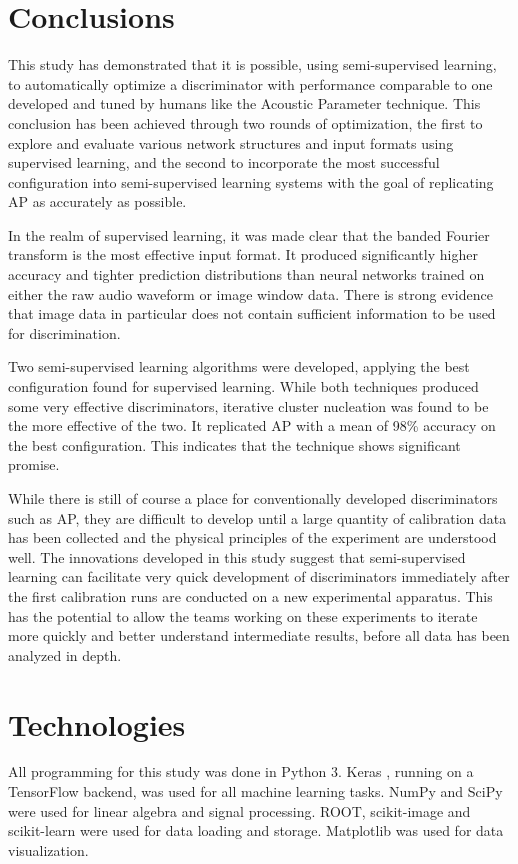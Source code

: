 \documentclass[10pt]{article}
\begin{document}
\section{Conclusions}

This study has demonstrated that it is possible, using semi-supervised learning, to automatically optimize a discriminator with performance comparable to one developed and tuned by humans like the Acoustic Parameter technique. This conclusion has been achieved through two rounds of optimization, the first to explore and evaluate various network structures and input formats using supervised learning, and the second to incorporate the most successful configuration into semi-supervised learning systems with the goal of replicating AP as accurately as possible.

In the realm of supervised learning, it was made clear that the banded Fourier transform is the most effective input format. It produced significantly higher accuracy and tighter prediction distributions than neural networks trained on either the raw audio waveform or image window data. There is strong evidence that image data in particular does not contain sufficient information to be used for discrimination.

Two semi-supervised learning algorithms were developed, applying the best configuration found for supervised learning. While both techniques produced some very effective discriminators, iterative cluster nucleation was found to be the more effective of the two. It replicated AP with a mean of 98\% accuracy on the best configuration. This indicates that the technique shows significant promise.

While there is still of course a place for conventionally developed discriminators such as AP, they are difficult to develop until a large quantity of calibration data has been collected and the physical principles of the experiment are understood well. The innovations developed in this study suggest that semi-supervised learning can facilitate very quick development of discriminators immediately after the first calibration runs are conducted on a new experimental apparatus. This has the potential to allow the teams working on these experiments to iterate more quickly and better understand intermediate results, before all data has been analyzed in depth.

\section{Technologies}

All programming for this study was done in Python 3. Keras \cite{keras}, running on a TensorFlow backend, was used for all machine learning tasks. NumPy and SciPy were used for linear algebra and signal processing. ROOT, scikit-image and scikit-learn were used for data loading and storage. Matplotlib was used for data visualization.

\printbibliography
\end{document}
